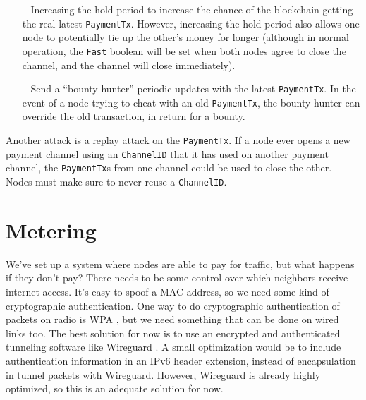 \documentclass[11pt]{article}
\begin{document}
\begin{itemize}
\item[--] Increasing the hold period to increase the chance of the blockchain getting the real latest \texttt{PaymentTx}. However, increasing the hold period also allows one node to potentially tie up the other’s money for longer (although in normal operation, the \texttt{Fast} boolean will be set when both nodes agree to close the channel, and the channel will close immediately).
 
\item[--] Send a ``bounty hunter'' periodic updates with the latest \texttt{PaymentTx}. In the event of a node trying to cheat with an old \texttt{PaymentTx}, the bounty hunter can override the old transaction, in return for a bounty.
\end{itemize} 

Another attack is a replay attack on the \texttt{PaymentTx}. If a node ever opens a new payment channel using an \texttt{ChannelID} that it has used on another payment channel, the \texttt{PaymentTx}s from one channel could be used to close the other. Nodes must make sure to never reuse a \texttt{ChannelID}. 

\section{Metering}
\label{sec:metering}
We’ve set up a system where nodes are able to pay for traffic, but what happens if they don’t pay? There needs to be some control over which neighbors receive internet access. It’s easy to spoof a MAC address, so we need some kind of cryptographic authentication. One way to do cryptographic authentication of packets on radio is WPA \cite{80211i}, but we need something that can be done on wired links too. The best solution for now is to use an encrypted and authenticated tunneling software like Wireguard \cite{wireguard}. A small optimization would be to include authentication information in an IPv6 header extension, instead of encapsulation in tunnel packets with Wireguard. However, Wireguard is already highly optimized, so this is an adequate solution for now.

\begin{figure}
\end{figure}
\end{document}
